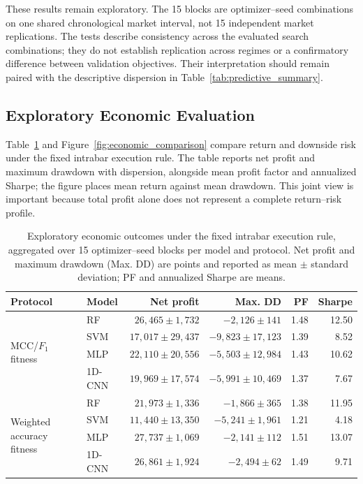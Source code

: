 These results remain exploratory. The 15 blocks are optimizer--seed combinations on one shared chronological market interval, not 15 independent market replications. The tests describe consistency across the evaluated search combinations; they do not establish replication across regimes or a confirmatory difference between validation objectives. Their interpretation should remain paired with the descriptive dispersion in Table~\ref{tab:predictive_summary}.

\subsection{Exploratory Economic Evaluation}

Table~\ref{tab:economic_summary} and Figure~\ref{fig:economic_comparison} compare return and downside risk under the fixed intrabar execution rule. The table reports net profit and maximum drawdown with dispersion, alongside mean profit factor and annualized Sharpe; the figure places mean return against mean drawdown. This joint view is important because total profit alone does not represent a complete return--risk profile.

\begin{table}[!htbp]
\centering
\caption{Exploratory economic outcomes under the fixed intrabar execution rule, aggregated over 15 optimizer--seed blocks per model and protocol. Net profit and maximum drawdown (Max. DD) are points and reported as mean $\pm$ standard deviation; PF and annualized Sharpe are means.}
\label{tab:economic_summary}
\footnotesize
\begin{tabular}{llrrrr}\toprule
\textbf{Protocol} & \textbf{Model} & \textbf{Net profit} & \textbf{Max. DD} & \textbf{PF} & \textbf{Sharpe}\\\midrule
\multirow{4}{*}{MCC/$F_1$ fitness} & RF & $26{,}465\pm1{,}732$ & $-2{,}126\pm141$ & 1.48 & 12.50\\
& SVM & $17{,}017\pm29{,}437$ & $-9{,}823\pm17{,}123$ & 1.39 & 8.52\\
& MLP & $22{,}110\pm20{,}556$ & $-5{,}503\pm12{,}984$ & 1.43 & 10.62\\
& 1D-CNN & $19{,}969\pm17{,}574$ & $-5{,}991\pm10{,}469$ & 1.37 & 7.67\\\midrule
\multirow{4}{*}{Weighted accuracy fitness} & RF & $21{,}973\pm1{,}336$ & $-1{,}866\pm365$ & 1.38 & 11.95\\
& SVM & $11{,}440\pm13{,}350$ & $-5{,}241\pm1{,}961$ & 1.21 & 4.18\\
& MLP & $27{,}737\pm1{,}069$ & $-2{,}141\pm112$ & 1.51 & 13.07\\
& 1D-CNN & $26{,}861\pm1{,}924$ & $-2{,}494\pm62$ & 1.49 & 9.71\\\bottomrule
\end{tabular}
\end{table}

